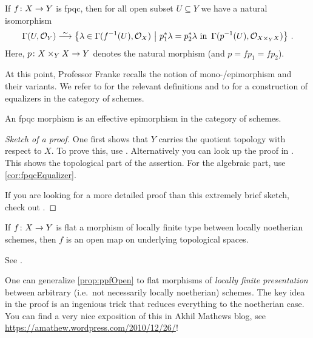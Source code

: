 \documentclass[a4paper, 10pt, oneside, DIV=9, chapterprefix=true, numbers=enddot, bibliography=totoc]{scrbook}
\begin{document}
\begin{cor}\label{cor:fpqcEqualizer}
	If $f\colon X\morphism Y$ is fpqc, then for all open subset $U\subseteq Y$ we have a natural isomorphism
	\begin{equation*}
		\Global(U,\Oo_Y)\isomorphism\left\{\lambda\in \Global(f^{-1}(U),\Oo_X)\st p_1^*\lambda =p_2^*\lambda\text{ in }\Global(p^{-1}(U),\Oo_{X\times_YX})\right\}\,.
	\end{equation*}
	Here, $p\colon X\times_YX\morphism Y$ denotes the natural morphism (and $p=fp_1=fp_2$).
\end{cor}
At this point, Professor Franke recalls the notion of mono-/epimorphism and their  variants. We refer to \cite[Appendix~A.1]{alggeo2} for the relevant definitions and to \cite[Subsection~1.3.1]{alggeo1} for a construction of equalizers in the category of schemes.
\begin{prop}\label{prop:fpqcEffectiveEpi}
	An fpqc morphism is an effective epimorphism in the category of schemes.
\end{prop}
\begin{proof}[Sketch of a proof]
	One first shows that $Y$ carries the quotient topology with respect to $X$. To prove this, use \cite[Exposé~VIII Théorème~4.1]{sga1}. Alternatively you can look up the proof in \cite[Proposition~2.5.3]{jacobians}. This shows the topological part of the assertion. For the algebraic part, use \cref{cor:fpqcEqualizer}.
	
	If you are looking for a more detailed proof than this extremely brief sketch, check out \cite[Corollary~2.6.2]{jacobians}.
\end{proof}
\begin{prop}\label{prop:ppfOpen}
	If $f\colon X\morphism Y$ is flat a morphism of locally finite type between locally noetherian schemes, then $f$ is an open map on underlying topological spaces.
\end{prop}
\begin{proof*}
	See \cite[Corollary~2.5.1]{jacobians}.
\end{proof*}
\begin{rem*}\label{rem*:nonNoetherianBaseChange}
	One can generalize \cref{prop:ppfOpen} to flat morphisms of \emph{locally finite presentation} between arbitrary (i.e.\ not necessarily locally noetherian) schemes. The key idea in the proof is an ingenious trick that reduces
	everything to the noetherian case. You can find a very nice exposition of this in Akhil Mathews
	blog, see \url{https://amathew.wordpress.com/2010/12/26/}!
\end{rem*}
\end{document}
